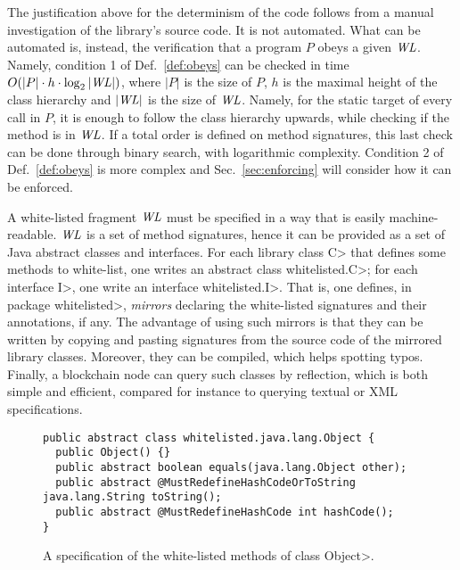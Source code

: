 The justification above for the determinism of the code follows from
a manual investigation of the library's source code. It is not automated. What can
be automated is, instead, the verification that a program $P$ obeys a given $\mathit{WL}$.
Namely, condition 1 of Def.~\ref{def:obeys} can be checked
in time $O(|P|\cdot h\cdot\log_2|\mathit{WL}|)$, where $|P|$ is the size of $P$,
$h$ is the maximal height of the class
hierarchy and $|\mathit{WL}|$ is the size of $\mathit{WL}$.
Namely, for the static target of every call in $P$, it is enough
to follow the class hierarchy upwards, while checking if the method is in $\mathit{WL}$. If a total
order is defined on method signatures, this last check can be done through binary search,
with logarithmic complexity. Condition 2 of Def.~\ref{def:obeys} is more complex and
Sec.~\ref{sec:enforcing} will consider how it can be enforced.

A white-listed fragment $\mathit{WL}$ must be specified in a way that is easily machine-readable.
$\mathit{WL}$ is a set of method signatures, hence it can be provided
as a set of Java abstract classes and interfaces. For each library class \<C> that defines some
methods to white-list, one writes an abstract class \<whitelisted.C>;
for each interface \<I>, one write an interface \<whitelisted.I>. That is, one defines,
in package \<whitelisted>, \emph{mirrors} declaring the white-listed signatures and
their annotations, if any.
The advantage of using such mirrors is that they can be written by copying and pasting
signatures from the source code of the mirrored library classes. Moreover, they can be compiled,
which helps spotting typos. Finally, a blockchain node can query such classes by reflection,
which is both simple and efficient, compared for instance to querying textual or XML
specifications.

\begin{figure}[t]
\begin{verbatim}
public abstract class whitelisted.java.lang.Object {
  public Object() {}
  public abstract boolean equals(java.lang.Object other);
  public abstract @MustRedefineHashCodeOrToString java.lang.String toString();
  public abstract @MustRedefineHashCode int hashCode();
}
\end{verbatim}
\caption{A specification of the white-listed methods of class \<Object>.}
\label{fig:white_listed_Object}
\end{figure}

